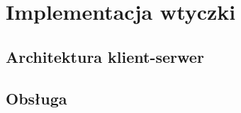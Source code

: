 \newpage %
 

\section{Implementacja wtyczki}
\subsection{Architektura klient-serwer}
\subsection{Obsługa}
  

